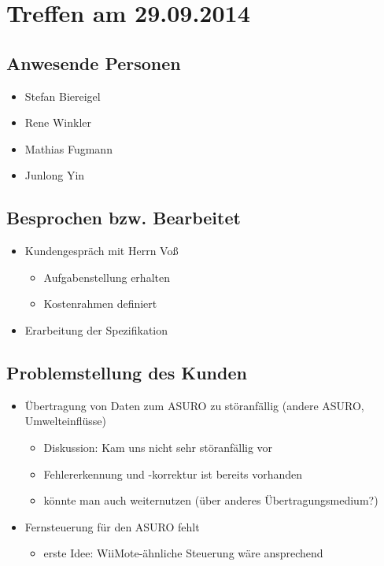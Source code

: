 \chapter{Treffen am 29.09.2014}
\section{Anwesende Personen}
\begin{itemize}
	\item Stefan Biereigel
	\item Rene Winkler
	\item Mathias Fugmann
	\item Junlong Yin
\end{itemize}

\section{Besprochen bzw. Bearbeitet}
\begin{itemize}
	\item Kundengespräch mit Herrn Voß
		\begin{itemize}
			\item Aufgabenstellung erhalten
			\item Kostenrahmen definiert
		\end{itemize}
	\item Erarbeitung der Spezifikation
\end{itemize}

\section{Problemstellung des Kunden}
\begin{itemize}
	\item Übertragung von Daten zum ASURO zu störanfällig (andere ASURO, Umwelteinflüsse)
	\begin{itemize}
		\item Diskussion: Kam uns nicht sehr störanfällig vor
		\item Fehlererkennung und -korrektur ist bereits vorhanden
		\item könnte man auch weiternutzen (über anderes Übertragungsmedium?)
	\end{itemize}
	\item Fernsteuerung für den ASURO fehlt
	\begin{itemize}
		\item erste Idee: WiiMote-ähnliche Steuerung wäre ansprechend
	\end{itemize}
\end{itemize}

